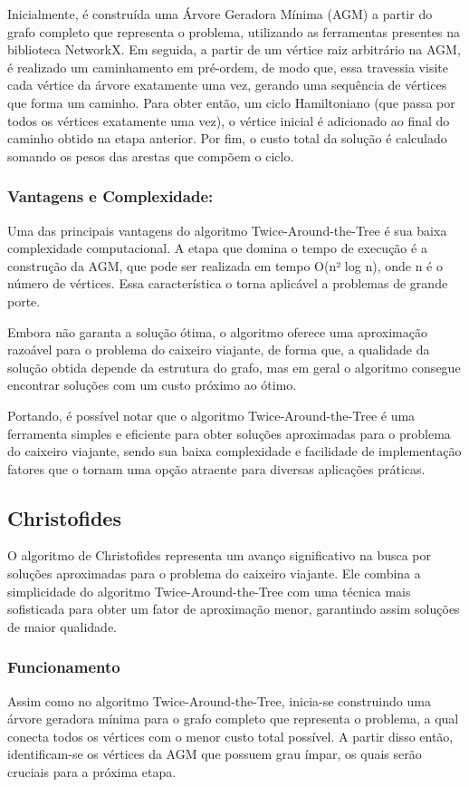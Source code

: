 \documentclass[12pt]{article}
\begin{document}
Inicialmente, é construída uma Árvore Geradora Mínima (AGM) a partir do grafo completo que representa o problema, utilizando as ferramentas presentes na biblioteca NetworkX. Em seguida, a partir de um vértice raiz arbitrário na AGM, é realizado um caminhamento em pré-ordem, de modo que, essa travessia visite cada vértice da árvore exatamente uma vez, gerando uma sequência de vértices que forma um caminho. Para obter então, um ciclo Hamiltoniano (que passa por todos os vértices exatamente uma vez), o vértice inicial é adicionado ao final do caminho obtido na etapa anterior. Por fim, o custo total da solução é calculado somando os pesos das arestas que compõem o ciclo. 

\subsubsection{Vantagens e Complexidade:}

Uma das principais vantagens do algoritmo Twice-Around-the-Tree é sua baixa complexidade computacional. A etapa que domina o tempo de execução é a construção da AGM, que pode ser realizada em tempo O(n² log n), onde n é o número de vértices. Essa característica o torna aplicável a problemas de grande porte.

Embora não garanta a solução ótima, o algoritmo oferece uma aproximação razoável para o problema do caixeiro viajante, de forma que, a qualidade da solução obtida depende da estrutura do grafo, mas em geral o algoritmo consegue encontrar soluções com um custo próximo ao ótimo.

Portando, é possível notar que o algoritmo Twice-Around-the-Tree é uma ferramenta simples e eficiente para obter soluções aproximadas para o problema do caixeiro viajante, sendo sua baixa complexidade e facilidade de implementação fatores que o tornam uma opção atraente para diversas aplicações práticas.

\subsection{Christofides}

O algoritmo de Christofides representa um avanço significativo na busca por soluções aproximadas para o problema do caixeiro viajante. Ele combina a simplicidade do algoritmo Twice-Around-the-Tree com uma técnica mais sofisticada para obter um fator de aproximação menor, garantindo assim soluções de maior qualidade.

\subsubsection{Funcionamento}
Assim como no algoritmo Twice-Around-the-Tree, inicia-se construindo uma árvore geradora mínima para o grafo completo que representa o problema, a qual conecta todos os vértices com o menor custo total possível. A partir disso então, identificam-se os vértices da AGM que possuem grau ímpar, os quais serão cruciais para a próxima etapa.
\end{document}
